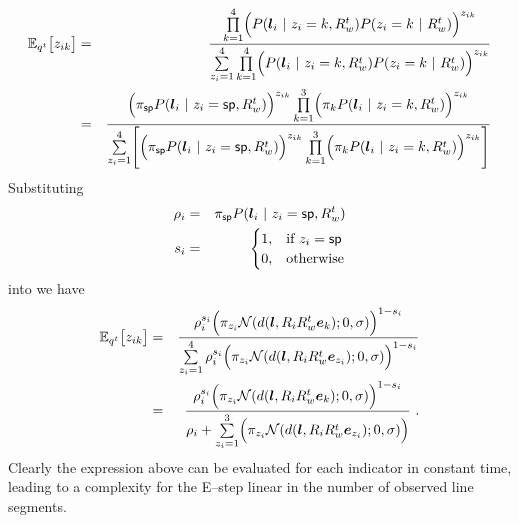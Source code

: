 \begin{eqnarray}
  \Expected_{\PosteriorEst^t}\bigl[ \Indicator_{ik} \bigr] 
  &=&
  \frac{
    \prod_{k=1}^4\limits \Bigl( 
      P(\LineSeg_i ~|~ \Indicator_i=k,\SceneR^t)
      P(\Indicator_i=k ~|~ \SceneR^t)
    \Bigr)^{\Indicator_{ik}}
  }{
    \sum_{\Indicator_i=1}^4\limits
    \prod_{k=1}^4\limits \Bigl( 
      P(\LineSeg_i ~|~ \Indicator_i=k,\SceneR^t)
      P(\Indicator_i=k ~|~ \SceneR^t)
    \Bigr)^{\Indicator_{ik}}
  }\\
  \label{eq:big-expectation}
  &=&
  \frac{
    \Bigl(
      \Mixing_{\Spurious}
      P(\LineSeg_i ~|~ \Indicator_i=\Spurious,\SceneR^t)
    \Bigr)^{\Indicator_{ik}}
    \prod_{k=1}^3\limits \Bigl(
      \Mixing_k
      P(\LineSeg_i ~|~ \Indicator_i=k,\SceneR^t)
    \Bigr)^{\Indicator_{ik}}
  }{
    \sum_{\Indicator_i=1}^4\limits \Biggl[
    \Bigl(
      \Mixing_{\Spurious}
      P(\LineSeg_i ~|~ \Indicator_i=\Spurious,\SceneR^t)
    \Bigr)^{\Indicator_{ik}}
    \prod_{k=1}^3\limits \Bigl( 
      \Mixing_k
      P(\LineSeg_i ~|~ \Indicator_i=k,\SceneR^t)
    \Bigr)^{\Indicator_{ik}}
    \Biggr]
  }
\end{eqnarray}
Substituting
\begin{eqnarray}
  \SpurJoint_i &=& 
    \Mixing_{\Spurious}
    P(\LineSeg_i ~|~ \Indicator_i=\Spurious,\SceneR^t) \\
  \SpurIndicator_i &=&
    \begin{cases}
      1, & \mbox{if } \Indicator_i = \Spurious \\
      0, & \mbox{otherwise}
    \end{cases}\\
\end{eqnarray}
into  we have
\begin{eqnarray}
  \Expected_{\PosteriorEst^t}\bigl[ \Indicator_{ik} \bigr]
  &=&
  \frac{
    \SpurJoint_i^{\SpurIndicator_i}
    \Bigl(
      \Mixing_{\Indicator_i}
      \NormalDistr(\dist(\LineSeg,\CamR_i\SceneR^t\ebasis_k); 0, \sigma)
    \Bigr)^{1-\SpurIndicator_i}
  }{
    \sum_{\Indicator_i=1}^4\limits
    \SpurJoint_i^{\SpurIndicator_i}
    \Bigl(
      \Mixing_{\Indicator_i}
      \NormalDistr(\dist(\LineSeg,\CamR_i\SceneR^t\ebasis_{\Indicator_i}); 0, \sigma)
    \Bigr)^{1-\SpurIndicator_i}
  }\\
  &=&
  \frac{
    \SpurJoint_i^{\SpurIndicator_i}
    \Bigl(
      \Mixing_{\Indicator_i}
      \NormalDistr(\dist(\LineSeg,\CamR_i\SceneR^t\ebasis_k); 0, \sigma)
    \Bigr)^{1-\SpurIndicator_i}
  }{
    \SpurJoint_i +
    \sum_{\Indicator_i=1}^3\limits
    \Bigl(
      \Mixing_{\Indicator_i}
      \NormalDistr(\dist(\LineSeg,\CamR_i\SceneR^t\ebasis_{\Indicator_i}); 0, \sigma)
    \Bigr)
  }~.
\end{eqnarray}
Clearly the expression above can be evaluated for each indicator in
constant time, leading to a complexity for the E--step linear
in the number of observed line segments.

